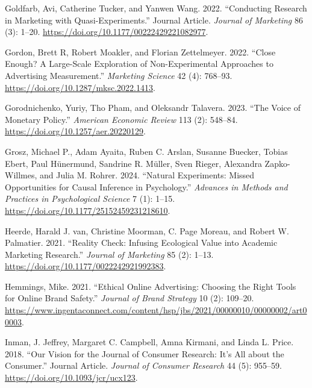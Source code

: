 \documentclass[
  a4paper,
]{scrreprt}
\newlength{\cslhangindent}
\newlength{\cslentryspacingunit} %
\newenvironment{CSLReferences}[2] %
 {%
  \setlength{\parindent}{0pt}
  \ifodd #1
  \let\oldpar\par
  \def\par{\hangindent=\cslhangindent\oldpar}
  \fi
  \setlength{\parskip}{#2\cslentryspacingunit}
 }%
 {}
\begin{document}
\begin{CSLReferences}{1}{0}
\leavevmode{}%
Goldfarb, Avi, Catherine Tucker, and Yanwen Wang. 2022. {``Conducting
Research in Marketing with Quasi-Experiments.''} Journal Article.
\emph{Journal of Marketing} 86 (3): 1--20.
\url{https://doi.org/10.1177/00222429221082977}.

\leavevmode{}%
Gordon, Brett R, Robert Moakler, and Florian Zettelmeyer. 2022. {``Close
Enough? A Large-Scale Exploration of Non-Experimental Approaches to
Advertising Measurement.''} \emph{Marketing Science} 42 (4): 768--93.
\url{https://doi.org/10.1287/mksc.2022.1413}.

\leavevmode{}%
Gorodnichenko, Yuriy, Tho Pham, and Oleksandr Talavera. 2023. {``The
Voice of Monetary Policy.''} \emph{American Economic Review} 113 (2):
548--84. \url{https://doi.org/10.1257/aer.20220129}.

\leavevmode{}%
Grosz, Michael P., Adam Ayaita, Ruben C. Arslan, Susanne Buecker, Tobias
Ebert, Paul Hünermund, Sandrine R. Müller, Sven Rieger, Alexandra
Zapko-Willmes, and Julia M. Rohrer. 2024. {``Natural Experiments: Missed
Opportunities for Causal Inference in Psychology.''} \emph{Advances in
Methods and Practices in Psychological Science} 7 (1): 1--15.
\url{https://doi.org/10.1177/25152459231218610}.

\leavevmode{}%
Heerde, Harald J. van, Christine Moorman, C. Page Moreau, and Robert W.
Palmatier. 2021. {``Reality Check: Infusing Ecological Value into
Academic Marketing Research.''} \emph{Journal of Marketing} 85 (2):
1--13. \url{https://doi.org/10.1177/0022242921992383}.

\leavevmode{}%
Hemmings, Mike. 2021. {``Ethical Online Advertising: Choosing the Right
Tools for Online Brand Safety.''} \emph{Journal of Brand Strategy} 10
(2): 109--20.
\url{https://www.ingentaconnect.com/content/hsp/jbs/2021/00000010/00000002/art00003}.

\leavevmode{}%
Inman, J. Jeffrey, Margaret C. Campbell, Amna Kirmani, and Linda L.
Price. 2018. {``Our Vision for the Journal of Consumer Research: It's
All about the Consumer.''} Journal Article. \emph{Journal of Consumer
Research} 44 (5): 955--59. \url{https://doi.org/10.1093/jcr/ucx123}.


\end{CSLReferences}
\end{document}
